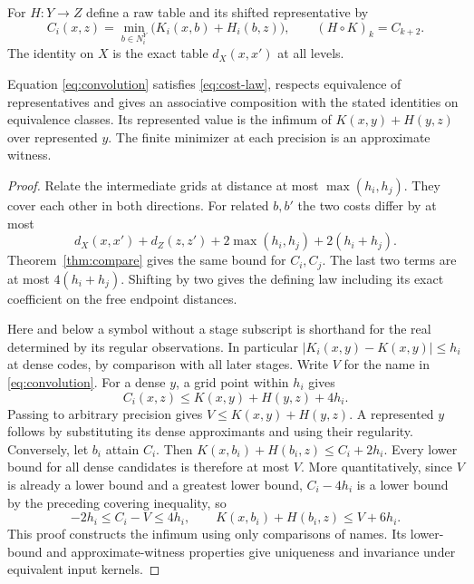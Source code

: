 For \(H:Y\to Z\) define a raw table and its shifted representative by
\begin{equation}
 C_i(x,z)=\min_{b\in N^Y_i}\big(K_i(x,b)+H_i(b,z)\big),\qquad
 (H\circ K)_k=C_{k+2}.
 \label{eq:convolution}
\end{equation}
The identity on \(X\) is the exact table \(d_X(x,x')\) at all levels.
\begin{theorem}\label{thm:cat}
Equation \eqref{eq:convolution} satisfies \eqref{eq:cost-law}, respects equivalence of representatives and gives an associative composition with the stated identities on equivalence classes. Its represented value is the infimum of \(K(x,y)+H(y,z)\) over represented \(y\). The finite minimizer at each precision is an approximate witness.
\end{theorem}
\begin{proof}
Relate the intermediate grids at distance at most \(\max(h_i,h_j)\). They cover each other in both directions. For related \(b,b'\) the two costs differ by at most
\[
 d_X(x,x')+d_Z(z,z')+2\max(h_i,h_j)+2(h_i+h_j).
\]
Theorem~\ref{thm:compare} gives the same bound for \(C_i,C_j\). The last two terms are at most \(4(h_i+h_j)\). Shifting by two gives the defining law including its exact coefficient on the free endpoint distances.

Here and below a symbol without a stage subscript is shorthand for the real determined by its regular observations. In particular \(|K_i(x,y)-K(x,y)|\le h_i\) at dense codes, by comparison with all later stages. Write \(V\) for the name in \eqref{eq:convolution}. For a dense \(y\), a grid point within \(h_i\) gives
\[
 C_i(x,z)\le K(x,y)+H(y,z)+4h_i.
\]
Passing to arbitrary precision gives \(V\le K(x,y)+H(y,z)\). A represented \(y\) follows by substituting its dense approximants and using their regularity. Conversely, let \(b_i\) attain \(C_i\). Then \(K(x,b_i)+H(b_i,z)\le C_i+2h_i\). Every lower bound for all dense candidates is therefore at most \(V\). More quantitatively, since \(V\) is already a lower bound and a greatest lower bound, \(C_i-4h_i\) is a lower bound by the preceding covering inequality, so
\[
 -2h_i\le C_i-V\le 4h_i,\qquad
 K(x,b_i)+H(b_i,z)\le V+6h_i.
\]
This proof constructs the infimum using only comparisons of names. Its lower-bound and approximate-witness properties give uniqueness and invariance under equivalent input kernels.


\end{proof}
